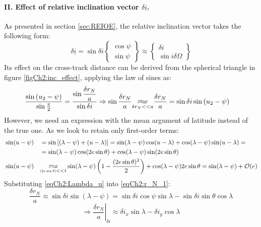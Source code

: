 			\paragraph{\textcolor{GMVred}{II.} Effect of relative inclination vector $\delta \underline{i}$. \\}
			\indent As presented in section \ref{sec:REIOE}, the relative inclination vector takes the following form:
			\[
			\delta \underline{i} = \sin\delta i\left\{
			\begin{array}{c}
			\cos\psi\\
			\sin\psi
			\end{array}
			\right\}
			\approx \left\{
			\begin{array}{c}
			\delta i \\
			\sin i \delta \Omega
			\end{array}
			\right\}
			\]
			\indent Its effect on the cross-track distance can be derived from the spherical triangle in figure \ref{figCh2:inc_effect}, applying the law of sines as:
			\begin{align}
			&\label{eqCh2:r_N_1} \dfrac{\sin \left(u_2 - \psi\right)}{\sin\frac{\pi}{2}} = \dfrac{\sin\dfrac{\delta r_N}{a}}{\sin \delta i} \Rightarrow \sin \dfrac{\delta r_N}{a} \underset{\delta r_N << a}{\longapprox} \dfrac{\delta r_N}{a} = \sin \delta i \sin\left(u_2 - \psi\right)
			\end{align}
			\indent However, we need an expression with the mean argument of latitude instead of the true one. As we look to retain only first-order terms:
			\begin{alignat}{4}
			&\nonumber \sin(u -  \psi) 	&&= \sin \left[ (\lambda - \psi) + (u - \lambda)\right] = \sin (\lambda - \psi) \cos (u - \lambda) + \cos(\lambda-\psi)\sin (u -  \lambda) =\\
			&\nonumber					&&  = \sin (\lambda - \psi) \cos(2e\sin\theta) + \cos(\lambda-\psi)\sin (2e\sin \theta) \\
			& \label{eqCh2:Lambda_u} \sin(u -  \psi)&& \underset{\tiny{\abs{2e\sin\theta} <<1}}{\longapprox}\sin (\lambda - \psi) \left(1 - \dfrac{(2e\sin\theta)^{2}}{2}\right) +  \cos(\lambda-\psi) 2e\sin\theta = \sin (\lambda - \psi) + \mathcal{O}(e)
			\end{alignat}
			\indent Substituting \eqref{eqCh2:Lambda_u} into \eqref{eqCh2:r_N_1}:
			\[
			\dfrac{\delta r_N}{a} \approx \sin\delta i \sin(\lambda - \psi) = \sin\delta i \cos\psi \sin \lambda - \sin\delta i \sin \theta \cos\lambda
			\]
			\begin{equation}
			\label{eqCh2:r_N_2} \Rightarrow \left.\dfrac{\delta r_N}{a}\right\rvert_{\delta i} \approx \delta i_x \sin \lambda - \delta i_y \cos\lambda
			\end{equation}

